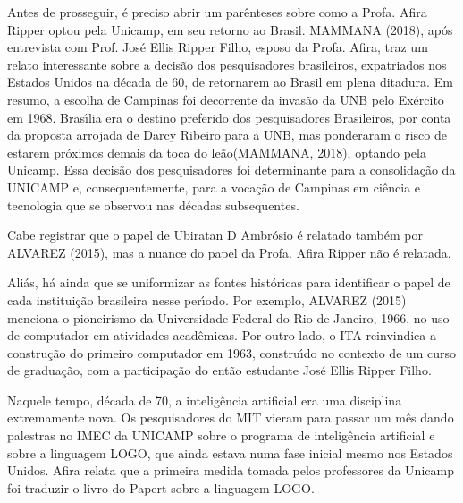 \documentclass[
12pt,		%
openright,	%
twoside,  %
a4paper,			%
chapter=TITLE,		%
english,			%
french,				%
spanish,			%
brazil				%
]{USPSC-classe/USPSC}
\begin{document}
Antes de prosseguir, \'e preciso abrir um par\^enteses sobre como a Profa. Afira Ripper optou pela Unicamp, em seu retorno ao Brasil.  MAMMANA (2018), ap\'os entrevista com Prof. Jos\'e Ellis Ripper Filho, esposo da Profa. Afira, traz um relato interessante sobre a decis\~ao dos pesquisadores brasileiros, expatriados nos Estados Unidos na d\'ecada de 60, de retornarem ao Brasil em plena ditadura. Em resumo, a escolha de Campinas foi decorrente da invas\~ao da UNB pelo Ex\'ercito em 1968. Bras\'{\i}lia era o destino preferido dos pesquisadores Brasileiros, por conta da proposta arrojada de Darcy Ribeiro para a UNB, mas ponderaram o risco de estarem pr\'oximos demais da \textquotedbl toca do le\~ao\textquotedbl   (MAMMANA, 2018), optando pela Unicamp. Essa decis\~ao dos pesquisadores foi determinante para a consolida\c{c}\~ao da UNICAMP e, consequentemente, para a voca\c{c}\~ao de Campinas em ci\^encia e tecnologia que se observou nas d\'ecadas subsequentes.










Cabe registrar que o papel de Ubiratan D Ambr\'osio \'e relatado tamb\'em por ALVAREZ (2015), mas a nuance do papel da Profa. Afira Ripper n\~ao \'e relatada.










Ali\'as, h\'a ainda que se uniformizar as fontes hist\'oricas para identificar o papel de cada institui\c{c}\~ao brasileira nesse per\'{\i}odo. Por exemplo,  ALVAREZ (2015) menciona o pioneirismo da Universidade Federal do Rio de Janeiro, 1966, no uso de computador em atividades acad\^emicas. Por outro lado, o ITA reinvindica a constru\c{c}\~ao do primeiro computador em 1963, constru\'{\i}do no contexto de um curso de gradua\c{c}\~ao, com a participa\c{c}\~ao do ent\~ao estudante Jos\'e Ellis Ripper Filho.










Naquele tempo, d\'ecada de 70, a intelig\^encia artificial era uma disciplina extremamente nova. Os pesquisadores do MIT vieram para passar um m\^es dando palestras no IMEC da UNICAMP sobre o programa de intelig\^encia artificial e sobre a linguagem LOGO, que ainda estava numa fase inicial mesmo nos Estados Unidos. Afira relata que a primeira medida tomada pelos professores da Unicamp foi traduzir o livro do Papert sobre a linguagem LOGO.
\end{document}
